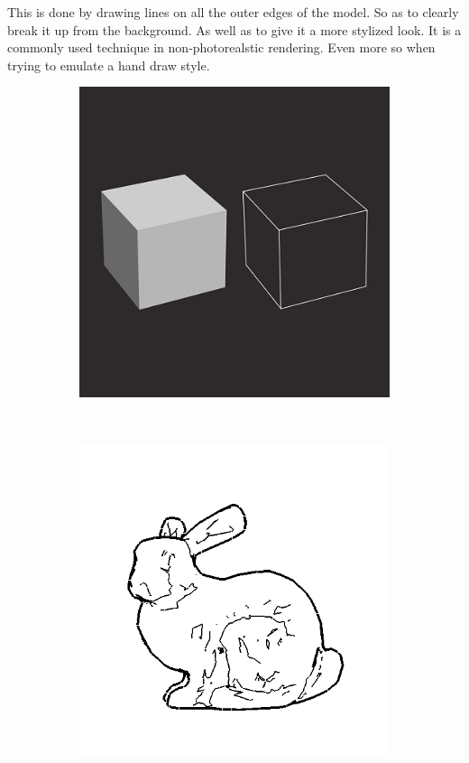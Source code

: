 \newpage 

This is done by drawing lines on all the outer edges of the model. So as to clearly break it up from the 
background. As well as to give it a more stylized look. It is a commonly used technique in non-photorealstic 
rendering. Even more so when trying to emulate a hand draw style.

\begin{figure}[h]
    \centering
    \begin{subfigure}[b]{0.3\textwidth}
    \centering
    \includegraphics[width=\textwidth]{img/Contour.jpg}
    \caption{}
    \label{fig-0}
\end{subfigure}
~
    \begin{subfigure}[b]{0.3\textwidth}
    \centering
    \includegraphics[width=\textwidth]{img/SuggestiveContours.png}

\end{subfigure}
\end{figure}
